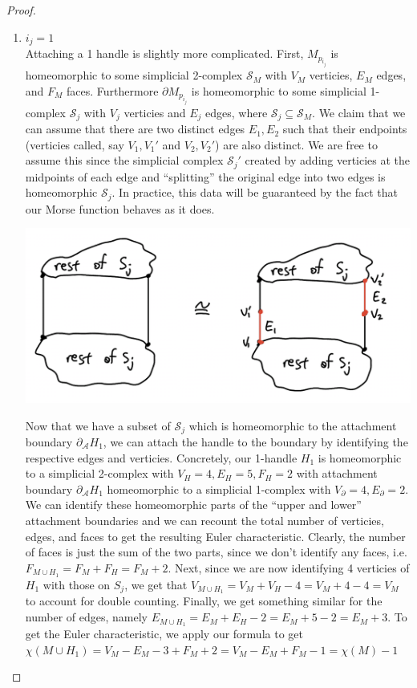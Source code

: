 \documentclass[12pt]{article}
\newcommand{\cA}{{\mathcal A}}
\newcommand{\cS}{{\mathcal S}}
\theoremstyle{definition}
\begin{document}
\begin{proof}
\begin{enumerate}
            \item $i_j = 1$\\
            Attaching a 1 handle is slightly more complicated. First, $M_{p_{i_j}}$ is homeomorphic to some simplicial 2-complex $\cS_M$ with $V_M$ verticies, $E_M$ edges, and $F_M$ faces. Furthermore $\partial M_{p_{i_j}}$ is homeomorphic to some simplicial 1-complex $\cS_j$ with $V_j$ verticies and $E_j$ edges, where $\cS_j \subseteq \cS_M$. We claim that we can assume that there are two distinct edges $E_1, E_2$ such that their endpoints (verticies called, say $V_1, V_1'$ and $V_2,V_2'$) are also distinct. We are free to assume this since the simplicial complex $\cS_j'$ created by adding verticies at the midpoints of each edge and ``splitting'' the original edge into two edges is homeomorphic $\cS_j$. In practice, this data will be guaranteed by the fact that our Morse function behaves as it does. 
            \begin{center}
                  \includegraphics[scale = 0.7]{sim.png}
            \end{center}
            Now that we have a subset of $\cS_j$ which is homeomorphic to the attachment boundary $\partial_\cA H_1$, we can attach the handle to the boundary by identifying the respective edges and verticies. Concretely, our 1-handle $H_1$ is homeomorphic to a simplicial 2-complex with $V_H = 4, E_H = 5, F_H = 2$ with attachment boundary $\partial_\cA H_1$ homeomorphic to a simplicial 1-complex with $V_\partial = 4, E_\partial = 2$. We can identify these homeomorphic parts of the ``upper and lower'' attachment boundaries and we can recount the total number of verticies, edges, and faces to get the resulting Euler characteristic. Clearly, the number of faces is just the sum of the two parts, since we don't identify any faces, i.e. $F_{M\cup H_1} = F_M + F_H = F_M + 2$. Next, since we are now identifying 4 verticies of $H_1$ with those on $S_j$, we get that $V_{M\cup H_1} = V_M + V_H - 4 = V_M + 4 - 4 = V_M$ to account for double counting. Finally, we get something similar for the number of edges, namely $E_{M\cup H_1} = E_M + E_H - 2 = E_M + 5 - 2 = E_M + 3$. To get the Euler characteristic, we apply our formula to get $\chi(M \cup H_1) = V_M - E_M - 3 + F_M + 2 = V_M - E_M+ F_M -1 = \chi(M)-1$
            


\end{enumerate}
\end{proof}
\end{document}
